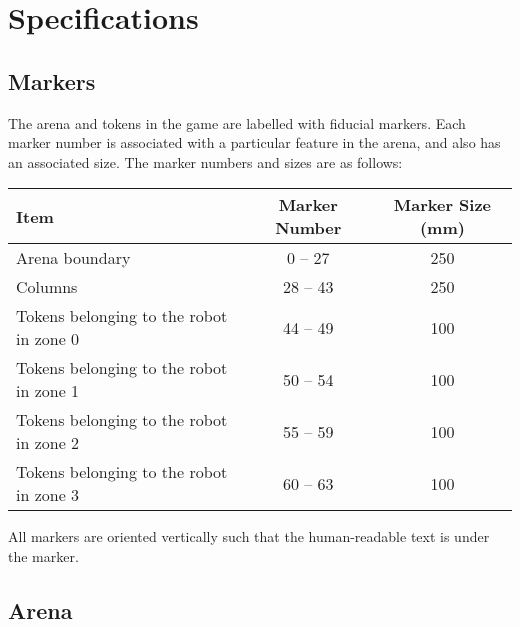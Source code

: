 \section{Specifications}
\label{sec:specs}

\subsection{Markers}
\label{spec:markers}

The arena and tokens in the game are labelled with fiducial
markers. Each marker number is associated with a particular feature in the
arena, and also has an associated size. The marker numbers and sizes are as
follows:

\begin{center}
\begin{tabular}{lcc}
  \toprule
  \textbf{Item} & \textbf{Marker Number} & \textbf{Marker Size (\si{mm})} \\
  \midrule
  Arena boundary & 0 -- 27 & 250 \\
  Columns & 28 -- 43 & 250 \\
  Tokens belonging to the robot in zone 0 & 44 -- 49 & 100 \\
  Tokens belonging to the robot in zone 1 & 50 -- 54 & 100 \\
  Tokens belonging to the robot in zone 2 & 55 -- 59 & 100 \\
  Tokens belonging to the robot in zone 3 & 60 -- 63 & 100 \\
  \bottomrule
\end{tabular}
\end{center}

All markers are oriented vertically such that the human-readable text
is under the marker.

\subsection{Arena}
\label{spec:arena}

